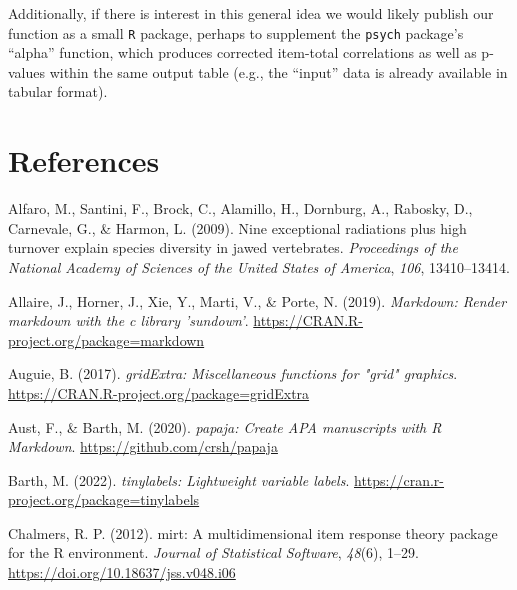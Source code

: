 \documentclass[
  man]{apa6}
\newlength{\cslhangindent}
\newlength{\cslentryspacingunit} %
\newenvironment{CSLReferences}[2] %
 {%
  \setlength{\parindent}{0pt}
  \ifodd #1
  \let\oldpar\par
  \def\par{\hangindent=\cslhangindent\oldpar}
  \fi
  \setlength{\parskip}{#2\cslentryspacingunit}
 }%
 {}
\begin{document}
Additionally, if there is interest in this general idea we would likely publish our function as a small \texttt{R} package, perhaps to supplement the \texttt{psych} package's ``alpha'' function, which produces corrected item-total correlations as well as p-values within the same output table (e.g., the ``input'' data is already available in tabular format).

\newpage

\hypertarget{references}{%
\section{References}\label{references}}

\begingroup
\setlength{\parindent}{-0.5in}
\setlength{\leftskip}{0.5in}

\hypertarget{refs}{}
\begin{CSLReferences}{1}{0}
\leavevmode{}%
Alfaro, M., Santini, F., Brock, C., Alamillo, H., Dornburg, A., Rabosky, D., Carnevale, G., \& Harmon, L. (2009). Nine exceptional radiations plus high turnover explain species diversity in jawed vertebrates. \emph{Proceedings of the National Academy of Sciences of the United States of America}, \emph{106}, 13410--13414.

\leavevmode{}%
Allaire, J., Horner, J., Xie, Y., Marti, V., \& Porte, N. (2019). \emph{Markdown: Render markdown with the c library 'sundown'}. \url{https://CRAN.R-project.org/package=markdown}

\leavevmode{}%
Auguie, B. (2017). \emph{gridExtra: Miscellaneous functions for "grid" graphics}. \url{https://CRAN.R-project.org/package=gridExtra}

\leavevmode{}%
Aust, F., \& Barth, M. (2020). \emph{{papaja}: {Create} {APA} manuscripts with {R Markdown}}. \url{https://github.com/crsh/papaja}

\leavevmode{}%
Barth, M. (2022). \emph{{tinylabels}: Lightweight variable labels}. \url{https://cran.r-project.org/package=tinylabels}

\leavevmode{}%
Chalmers, R. P. (2012). {mirt}: A multidimensional item response theory package for the {R} environment. \emph{Journal of Statistical Software}, \emph{48}(6), 1--29. \url{https://doi.org/10.18637/jss.v048.i06}


\end{CSLReferences}
\end{document}
